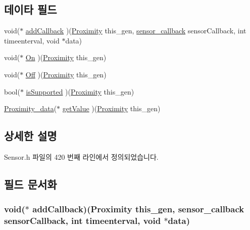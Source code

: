\subsection*{데이타 필드}
\begin{DoxyCompactItemize}
\item 
void($\ast$ \hyperlink{struct___proximity_a6d46869067f8f072514623e8dbc86cfa}{add\-Callback} )(\hyperlink{_sensor_8h_a6ba1e9dd519249c4112807daf04e17e5}{Proximity} this\-\_\-gen, \hyperlink{_sensor_8h_ad8114207845fc5e0aa30832f0c718cd6}{sensor\-\_\-callback} sensor\-Callback, int timeenterval, void $\ast$data)
\item 
void($\ast$ \hyperlink{struct___proximity_a4a9a95df8401d22845c7cc21392de00a}{On} )(\hyperlink{_sensor_8h_a6ba1e9dd519249c4112807daf04e17e5}{Proximity} this\-\_\-gen)
\item 
void($\ast$ \hyperlink{struct___proximity_a25912193ba611f9680ac4e897f0d4489}{Off} )(\hyperlink{_sensor_8h_a6ba1e9dd519249c4112807daf04e17e5}{Proximity} this\-\_\-gen)
\item 
bool($\ast$ \hyperlink{struct___proximity_adfb2002e855b02ccf6f3dbcd636723ea}{is\-Supported} )(\hyperlink{_sensor_8h_a6ba1e9dd519249c4112807daf04e17e5}{Proximity} this\-\_\-gen)
\item 
\hyperlink{_sensor_8h_a662d5923038d3329cc0219faaed6ddf3}{Proximity\-\_\-data}($\ast$ \hyperlink{struct___proximity_abf3276a84c1e43e8e5ff5ecb6c665ee1}{get\-Value} )(\hyperlink{_sensor_8h_a6ba1e9dd519249c4112807daf04e17e5}{Proximity} this\-\_\-gen)
\end{DoxyCompactItemize}


\subsection{상세한 설명}


Sensor.\-h 파일의 420 번째 라인에서 정의되었습니다.



\subsection{필드 문서화}
\hypertarget{struct___proximity_a6d46869067f8f072514623e8dbc86cfa}{
\subsubsection[{add\-Callback}]{\setlength{\rightskip}{0pt plus 5cm}void($\ast$  add\-Callback)({\bf Proximity} this\-\_\-gen, {\bf sensor\-\_\-callback} sensor\-Callback, int timeenterval, void $\ast$data)}}\label{struct___proximity_a6d46869067f8f072514623e8dbc86cfa}


